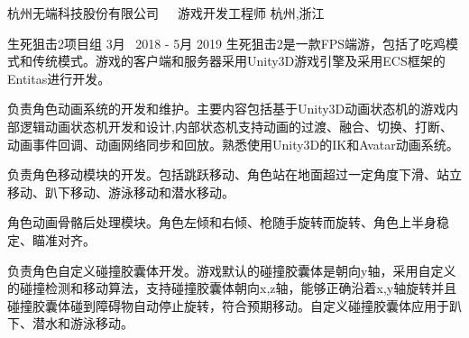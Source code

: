 \begin{cventries}

\cventrycompany
{杭州无端科技股份有限公司~~~游戏开发工程师} %
{杭州,浙江} %

\cventryproject
{生死狙击2项目组} %
{3月~ 2018 - 5月 2019} %
{生死狙击2是一款FPS端游，包括了吃鸡模式和传统模式。游戏的客户端和服务器采用Unity3D游戏引擎及采用ECS框架的Entitas进行开发。}
{ %
\begin{cvitems}
\item {负责角色动画系统的开发和维护。主要内容包括基于Unity3D动画状态机的游戏内部逻辑动画状态机开发和设计,内部状态机支持动画的过渡、融合、切换、打断、动画事件回调、动画网络同步和回放。熟悉使用Unity3D的IK和Avatar动画系统。}
\item{负责角色移动模块的开发。包括跳跃移动、角色站在地面超过一定角度下滑、站立移动、趴下移动、游泳移动和潜水移动。}
\item{角色动画骨骼后处理模块。角色左倾和右倾、枪随手旋转而旋转、角色上半身稳定、瞄准对齐。}
\item{负责角色自定义碰撞胶囊体开发。游戏默认的碰撞胶囊体是朝向y轴，采用自定义的碰撞检测和移动算法，支持碰撞胶囊体朝向x,z轴，能够正确沿着x,y轴旋转并且碰撞胶囊体碰到障碍物自动停止旋转，符合预期移动。自定义碰撞胶囊体应用于趴下、潜水和游泳移动。}
\end{cvitems}
}


\end{cventries}
